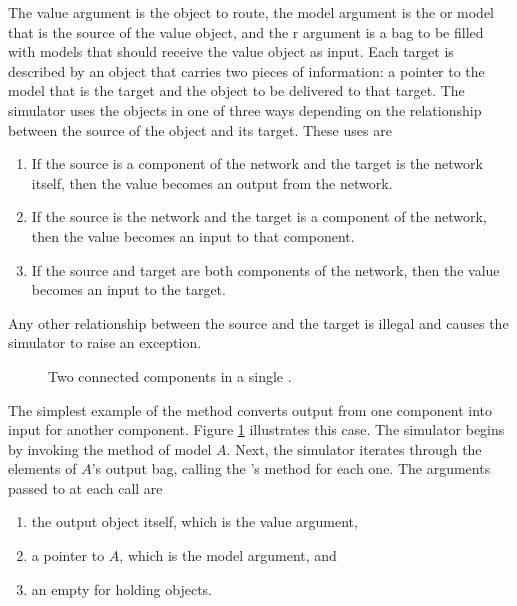 The value argument is the object to route, the model argument is the  or  model that is the source of the value object, and the r argument is a bag to be filled with models that should receive the value object as input. Each target is described by an  object that carries two pieces of information: a pointer to the model that is the target and the object to be delivered to that target. The simulator uses the  objects in one of three ways depending on the relationship between the source of the object and its target. These uses are
\begin{enumerate}
\item If the source is a component of the network and the target is the network itself, then the value becomes an output from the network.
\item If the source is the network and the target is a component of the network, then the value becomes an input to that component.
\item If the source and target are both components of the network, then the value becomes an input to the target.
\end{enumerate}
Any other relationship between the source and the target is illegal and causes the simulator to raise an exception.

\begin{figure}[ht]
\centering
{}
\caption{Two connected  components in a single .}
\label{fig:atomic_to_atomic_coupling}
\end{figure} 
The simplest example of the  method converts output from one  component into input for another  component. Figure \ref{fig:atomic_to_atomic_coupling} illustrates this case. The simulator begins by invoking the  method of  model $A$. Next, the simulator iterates through the elements of $A$'s output bag, calling the 's  method for each one. The arguments passed to  at each call are
\begin{enumerate}
\item the output object itself, which is the value argument,
\item a pointer to $A$, which is the model argument, and
\item an empty  for holding  objects.
\end{enumerate} 

